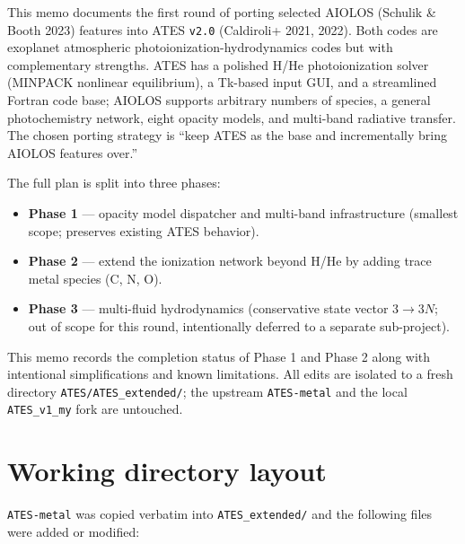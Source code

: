 \documentclass[english,a4paper]{kiseon_memo}
\begin{document}
This memo documents the first round of porting selected AIOLOS (Schulik \& Booth 2023)
features into ATES \texttt{v2.0} (Caldiroli+ 2021, 2022). Both codes are exoplanet
atmospheric photoionization-hydrodynamics codes but with complementary strengths.
ATES has a polished H/He photoionization solver (MINPACK nonlinear equilibrium),
a Tk-based input GUI, and a streamlined Fortran code base; AIOLOS supports
arbitrary numbers of species, a general photochemistry network, eight opacity
models, and multi-band radiative transfer. The chosen porting strategy is
``keep ATES as the base and incrementally bring AIOLOS features over.''

The full plan is split into three phases:
\begin{itemize}
\item \textbf{Phase 1} --- opacity model dispatcher and multi-band infrastructure
(smallest scope; preserves existing ATES behavior).
\item \textbf{Phase 2} --- extend the ionization network beyond H/He by adding
trace metal species (C, N, O).
\item \textbf{Phase 3} --- multi-fluid hydrodynamics (conservative state vector
$3 \to 3N$; out of scope for this round, intentionally deferred to a separate
sub-project).
\end{itemize}

This memo records the completion status of Phase 1 and Phase 2 along with
intentional simplifications and known limitations. All edits are isolated to a
fresh directory \texttt{ATES/ATES\_extended/}; the upstream
\texttt{ATES-metal} and the local \texttt{ATES\_v1\_my} fork are untouched.

\section{Working directory layout}

\texttt{ATES-metal} was copied verbatim into \texttt{ATES\_extended/} and
the following files were added or modified:
\end{document}
